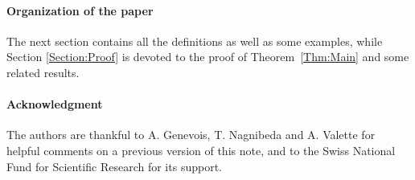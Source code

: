\paragraph{Organization of the paper}
The next section contains all the definitions as well as some examples, while Section \ref{Section:Proof} is devoted to the proof of Theorem~\ref{Thm:Main} and some related results.
%
%
%
\paragraph{Acknowledgment}
The authors are thankful to A. Genevois, T. Nagnibeda and A. Valette for helpful comments on a previous version of this note, and to the Swiss National Fund for Scientific Research for its support.
%
%
%

